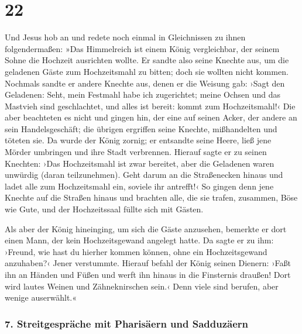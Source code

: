 \hypertarget{section-21}{%
\section{22}\label{section-21}}

 Und Jesus hob an und redete noch einmal in Gleichnissen
zu ihnen folgendermaßen:  »Das Himmelreich ist einem König
vergleichbar, der seinem Sohne die Hochzeit ausrichten wollte.
 Er sandte also seine Knechte aus, um die geladenen Gäste
zum Hochzeitsmahl zu bitten; doch sie wollten nicht kommen.
 Nochmals sandte er andere Knechte aus, denen er die
Weisung gab: ›Sagt den Geladenen: Seht, mein Festmahl habe ich
zugerichtet; meine Ochsen und das Mastvieh sind geschlachtet, und alles
ist bereit: kommt zum Hochzeitsmahl!‹  Die aber beachteten
es nicht und gingen hin, der eine auf seinen Acker, der andere an sein
Handelsgeschäft;  die übrigen ergriffen seine Knechte,
mißhandelten und töteten sie.  Da wurde der König zornig;
er entsandte seine Heere, ließ jene Mörder umbringen und ihre Stadt
verbrennen.  Hierauf sagte er zu seinen Knechten: ›Das
Hochzeitsmahl ist zwar bereitet, aber die Geladenen waren unwürdig
(daran teilzunehmen).  Geht darum an die Straßenecken
hinaus und ladet alle zum Hochzeitsmahl ein, soviele ihr antrefft!‹
 So gingen denn jene Knechte auf die Straßen hinaus und
brachten alle, die sie trafen, zusammen, Böse wie Gute, und der
Hochzeitssaal füllte sich mit Gästen.

 Als aber der König hineinging, um sich die Gäste
anzusehen, bemerkte er dort einen Mann, der kein Hochzeitsgewand
angelegt hatte.  Da sagte er zu ihm: ›Freund, wie hast du
hierher kommen können, ohne ein Hochzeitsgewand anzuhaben?‹ Jener
verstummte.  Hierauf befahl der König seinen Dienern:
›Faßt ihn an Händen und Füßen und werft ihn hinaus in die Finsternis
draußen! Dort wird lautes Weinen und Zähneknirschen sein.‹
 Denn viele sind berufen, aber wenige auserwählt.«

\hypertarget{streitgespruxe4che-mit-pharisuxe4ern-und-sadduzuxe4ern}{%
\subsubsection{7. Streitgespräche mit Pharisäern und
Sadduzäern}\label{streitgespruxe4che-mit-pharisuxe4ern-und-sadduzuxe4ern}}


